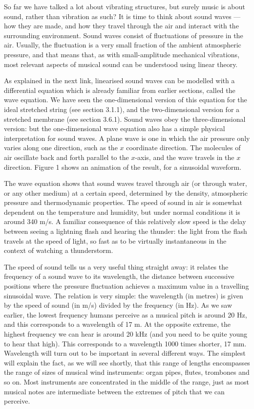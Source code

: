   So far we have talked a lot about vibrating structures, but surely music is 
  about sound, rather than vibration as such? It is time to think about sound 
  waves --- how they are made, and how they travel through the air and interact 
  with the surrounding environment. Sound waves consist of fluctuations of 
  pressure in the air. Usually, the fluctuation is a very small fraction of the 
  ambient atmospheric pressure, and that means that, as with small-amplitude 
  mechanical vibrations, most relevant aspects of musical sound can be 
  understood using linear theory. 

  As explained in the next link, linearised sound waves can be modelled with a 
  differential equation which is already familiar from earlier sections, called 
  the wave equation. We have seen the one-dimensional version of this equation 
  for the ideal stretched string (see section 3.1.1), and the two-dimensional 
  version for a stretched membrane (see section 3.6.1). Sound waves obey the 
  three-dimensional version: but the one-dimensional wave equation also has a 
  simple physical interpretation for sound waves. A plane wave is one in which 
  the air pressure only varies along one direction, such as the $x$ coordinate 
  direction. The molecules of air oscillate back and forth parallel to the 
  $x$-axis, and the wave travels in the $x$ direction. Figure 1 shows an 
  animation of the result, for a sinusoidal waveform. 

  The wave equation shows that sound waves travel through air (or through 
  water, or any other medium) at a certain speed, determined by the density, 
  atmospheric pressure and thermodynamic properties. The speed of sound in air 
  is somewhat dependent on the temperature and humidity, but under normal 
  conditions it is around 340 m/s. A familiar consequence of this relatively 
  slow speed is the delay between seeing a lightning flash and hearing the 
  thunder: the light from the flash travels at the speed of light, so fast as 
  to be virtually instantaneous in the context of watching a thunderstorm. 

  The speed of sound tells us a very useful thing straight away: it relates the 
  frequency of a sound wave to its wavelength, the distance between successive 
  positions where the pressure fluctuation achieves a maximum value in a 
  travelling sinusoidal wave. The relation is very simple: the wavelength (in 
  metres) is given by the speed of sound (in m/s) divided by the frequency (in 
  Hz). As we saw earlier, the lowest frequency humans perceive as a musical 
  pitch is around 20 Hz, and this corresponds to a wavelength of 17 m. At the 
  opposite extreme, the highest frequency we can hear is around 20 kHz (and you 
  need to be quite young to hear that high). This corresponds to a wavelength 
  1000 times shorter, 17 mm. Wavelength will turn out to be important in 
  several different ways. The simplest will explain the fact, as we will see 
  shortly, that this range of lengths encompasses the range of sizes of musical 
  wind instruments: organ pipes, flutes, trombones and so on. Most instruments 
  are concentrated in the middle of the range, just as most musical notes are 
  intermediate between the extremes of pitch that we can perceive. 


